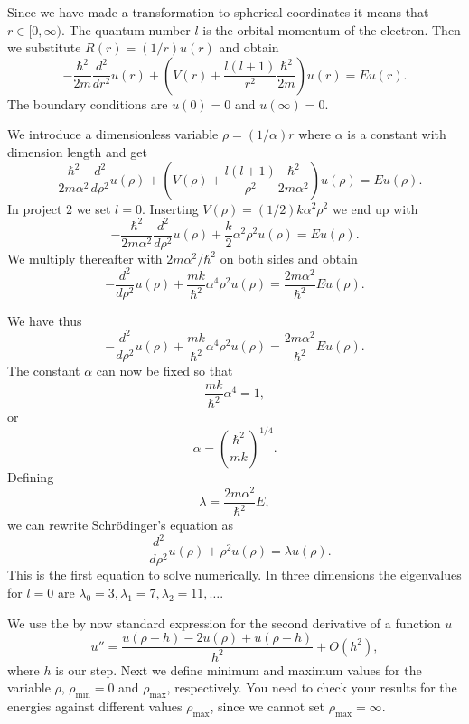 Since we have made a transformation to spherical coordinates it means that 
$r\in [0,\infty)$.  
The quantum number
$l$ is the orbital momentum of the electron.  
%
Then we substitute $R(r) = (1/r) u(r)$ and obtain
%
\[
  -\frac{\hbar^2}{2 m} \frac{d^2}{dr^2} u(r) 
       + \left ( V(r) + \frac{l (l + 1)}{r^2}\frac{\hbar^2}{2 m}
                                    \right ) u(r)  = E u(r) .
\]
%
The boundary conditions are $u(0)=0$ and $u(\infty)=0$.


We introduce a dimensionless variable $\rho = (1/\alpha) r$
where $\alpha$ is a constant with dimension length and get
% 
\[
  -\frac{\hbar^2}{2 m \alpha^2} \frac{d^2}{d\rho^2} u(\rho) 
       + \left ( V(\rho) + \frac{l (l + 1)}{\rho^2}
         \frac{\hbar^2}{2 m\alpha^2} \right ) u(\rho)  = E u(\rho) .
\]
%
In project 2 we set $l=0$.
Inserting $V(\rho) = (1/2) k \alpha^2\rho^2$ we end up with
\[
  -\frac{\hbar^2}{2 m \alpha^2} \frac{d^2}{d\rho^2} u(\rho) 
       + \frac{k}{2} \alpha^2\rho^2u(\rho)  = E u(\rho) .
\]
We multiply thereafter with $2m\alpha^2/\hbar^2$ on both sides and obtain
\[
  -\frac{d^2}{d\rho^2} u(\rho) 
       + \frac{mk}{\hbar^2} \alpha^4\rho^2u(\rho)  = \frac{2m\alpha^2}{\hbar^2}E u(\rho) .
\]


We have thus
\[
  -\frac{d^2}{d\rho^2} u(\rho) 
       + \frac{mk}{\hbar^2} \alpha^4\rho^2u(\rho)  = \frac{2m\alpha^2}{\hbar^2}E u(\rho) .
\]
The constant $\alpha$ can now be fixed
so that
\[
\frac{mk}{\hbar^2} \alpha^4 = 1,
\]
or 
\[
\alpha = \left(\frac{\hbar^2}{mk}\right)^{1/4}.
\]
Defining 
\[
\lambda = \frac{2m\alpha^2}{\hbar^2}E,
\]
we can rewrite Schr\"odinger's equation as
\[
  -\frac{d^2}{d\rho^2} u(\rho) + \rho^2u(\rho)  = \lambda u(\rho) .
\]
This is the first equation to solve numerically. In three dimensions 
the eigenvalues for $l=0$ are 
$\lambda_0=3,\lambda_1=7,\lambda_2=11,\dots .$



We use the by now standard
expression for the second derivative of a function $u$
\begin{equation}
    u''=\frac{u(\rho+h) -2u(\rho) +u(\rho-h)}{h^2} +O(h^2),
    \label{eq:diffoperation}
\end{equation} 
where $h$ is our step.
Next we define minimum and maximum values for the variable $\rho$,
$\rho_{\mathrm{min}}=0$  and $\rho_{\mathrm{max}}$, respectively.
You need to check your results for the energies against different values
$\rho_{\mathrm{max}}$, since we cannot set
$\rho_{\mathrm{max}}=\infty$. 




